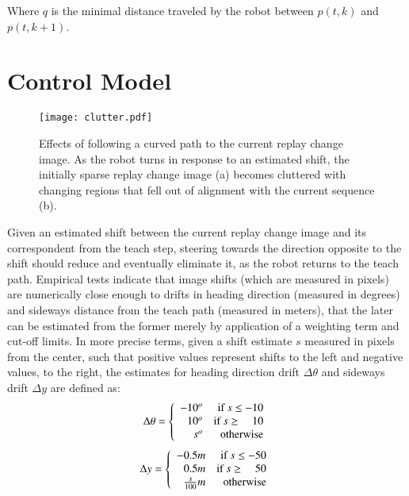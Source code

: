 \documentclass[twocolumn, 9pt,fleqn]{jsproceedings}
\begin{document}
Where $q$ is the minimal distance traveled by the robot between $p(t, k)$ and $p(t, k+1)$.

\section{Control Model}

\begin{figure}[b]
\centering
\texttt{[image: clutter.pdf]}
\caption{Effects of following a curved path to the current replay change image. As the robot turns in response to an estimated shift, the initially sparse replay change image (a) becomes cluttered with changing regions that fell out of alignment with the current sequence (b).}
\label{fig:clutter}
\end{figure}

Given an estimated shift between the current replay change image and its correspondent from the teach step, steering towards the direction opposite to the shift should reduce and eventually eliminate it, as the robot returns to the teach path. Empirical tests indicate that image shifts (which are measured in pixels) are numerically close enough to drifts in heading direction (measured in degrees) and sideways distance from the teach path (measured in meters), that the later can be estimated from the former merely by application of a weighting term and cut-off limits. In more precise terms, given a shift estimate $s$ measured in pixels from the center, such that positive values represent shifts to the left and negative values, to the right, the estimates for heading direction drift $\Delta \theta$ and sideways drift $\Delta y$ are defined as:
\begin{equation}
\Delta \theta =
\left\{
\begin{array}{r r}
-10^o & \text{if } s \leq -10 \\
10^o & \text{if } s \geq \;\;\;\, 10 \\
s^o & \text{otherwise}
\end{array}
\right.
\end{equation}
\begin{equation}
\Delta y =
\left\{
\begin{array}{r r}
-0.5m & \text{if } s \leq -50 \\
0.5m & \text{if } s \geq \;\;\;\, 50 \\
\frac{s}{100}m & \text{otherwise}
\end{array}
\right.
\end{equation}
\end{document}
